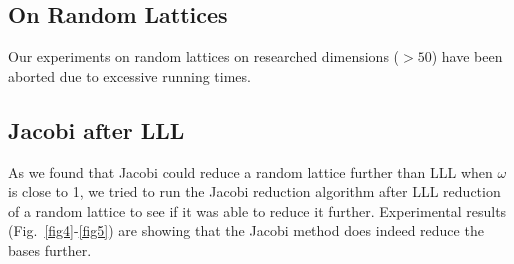 \documentclass[10pt, a4paper]{article}
\begin{document}
\subsection{On Random Lattices}

Our experiments on random lattices on researched dimensions ($> 50$) have been aborted due to excessive running times.

\subsection{Jacobi after LLL}

As we found that Jacobi could reduce a random lattice further than LLL when $\omega$ is close to 1, we tried to run the Jacobi reduction algorithm after LLL reduction of a random lattice to see if it was able to reduce it further. Experimental results (Fig.~\ref{fig4}-\ref{fig5}) are showing that the Jacobi method does indeed reduce the bases further.
\end{document}
